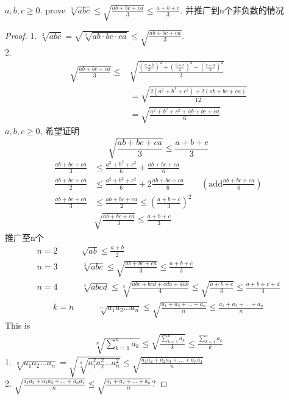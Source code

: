 \begin{example}
	$ a,b,c\ge 0. $ prove $ \sqrt[3]{abc}\le\sqrt{\frac{ab+bc+ca}{3}} \leqslant \frac{a+b+c}{3} $.
	并推广到n个非负数的情况
	\begin{proof}
		1. $ \sqrt[3]{abc} = \sqrt{\sqrt[3]{ab\cdot bc\cdot ca}} \leqslant \sqrt{\frac{ab+bc+ca}{3}} $.\\
		2. 
		\begin{align*}
			\sqrt{\frac{ab+bc+ca}{3}} 
			\leqslant &\sqrt{\frac{(\frac{a+b}{2})^2+(\frac{b+c}{2})^2+(\frac{c+a}{2})^2}{3}} \\
			&= \sqrt{\frac{2(a^2+b^2+c^2)+2(ab+bc+ca)}{12}}\\
			&= \sqrt{\frac{a^2+b^2+c^2+ab+bc+ca}{6}}
		\end{align*}
		$ a,b,c\ge 0 $, 希望证明\[\sqrt{\frac{ab+bc+ca}{3}}\leqslant \frac{a+b+c}{3}\]
		\begin{align*}
			\frac{ab+bc+ca}{3} &\leqslant \frac{a^2+b^2+c^2}{6} + \frac{ab+bc+ca}{6}\\
			\frac{ab+bc+ca}{2} &\leqslant \frac{a^2+b^2+c^2}{6} + 2\frac{ab+bc+ca}{6}\qquad(\text{add} \frac{ab+bc+ca}{6})\\
			\frac{ab+bc+ca}{3} &\leqslant \frac{ab+bc+ca}{2} \leqslant (\frac{a+b+c}{3})^2\\
			&\sqrt{\frac{ab+bc+ca}{3}} \leqslant \frac{a+b+c}{3}
		\end{align*}
		推广至n个
		\begin{align*}[l]
			n=2\qquad& \sqrt{ab} \le\frac{a+b}{2}\\
			n=3\qquad& \sqrt[3]{abc}  \leqslant \sqrt{\frac{ab+bc+ca}{3}} \leqslant \frac{a+b+c}{3}\\
			n=4\qquad& \sqrt[4]{abcd}  \leqslant \sqrt[3]{\frac{abc+bcd+cda+dab}{4}} \leqslant \sqrt{\frac{a+b+c}{3}}\le\frac{a+b+c+d}{4}
		\end{align*}
		\begin{align*}
			k = n \qquad& \sqrt[n]{a_1a_2\dots a_n} \leqslant 		\sqrt{\frac{a_1+a_2+\dots+a_n}{n}}\le\frac{a_1+a_2+\dots+a_n}{n}
		\end{align*}
		This is
		\begin{align*}
			\sqrt[n]{\sum_{k=1}^n a_k} \leqslant \sqrt{\frac{\sum_{k=1}^n a_k}{k}}\le\frac{\sum_{k=1}^n a_k}{k}
		\end{align*}
		1. $ \sqrt[n]{a_1 a_2 \dots a_n} = \sqrt{\sqrt[n]{a_1^2 a_2^2 \dots a_n^2}} \leqslant \sqrt{\frac{a_1 a_2 + a_2 a_3 + \dots + a_n a_1}{n}}$\\
		2. $ \sqrt{\frac{a_1 a_2 + a_2 a_3 + \dots + a_n a_1}{n}} \leqslant \sqrt{\frac{a_1+ a_2 + \dots + a_n}{n}} $?
	\end{proof}
\end{example}

